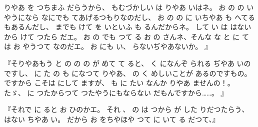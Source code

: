 りやあ
を
つちまふ
だらうから、
もむづかしい
は
りやあ
いはネ。
お
の
の
いやうになら
なにでも
てあげるつもりなのだし、
お
の
の
に
いちやあ
も
へてる
もあるんだし、
までも
けて
を
いといふ
も
るんだからネ。
して
い
は
はないから
けて
つたら
だエ。
お
の
でも
つて
る
お
の
さんネ、そんな
な
と
に
て
は
お
やうつて
なのだエ。
お
にも
い、
らないぢやあないか。
』

『そりやあもう
と
の
の
の
が
めて
て
ると、
く
になんぞ
られる
ぢやあ
いのですし、
に
た
の
も
になつて
りやあ、
の
く
めしいことが
あるのですもの。
ですから
こそは
にして
ますが、
も
に
たい
なんか
りやあ
ませんの！。
たゞ、
に
つたからつて
つたやうにもならない
だもんですから……。
』

『それで
に
ると
お
ひのかエ。
それ
、
の
は
つから
が
した
りだつたらう、
はない
ちやあ
い。
だから
お
をちやほや
つて
に
いて
る
だつて、』

